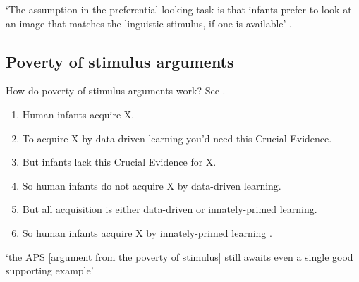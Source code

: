 \documentclass[12pt]{extarticle}
\begin{document}
\begin{multicols}{3}
\begin{enumerate}
\end{enumerate}

‘The assumption in the preferential looking task is that infants prefer to look at an image that matches the linguistic stimulus, if one is available’ \citep{lidz:2003_what}.

\subsection{Poverty of stimulus arguments}

How do poverty of stimulus arguments work? See \citet{pullum:2002_empirical}.

\begin{enumerate}

\item

Human infants acquire X.

\item

To acquire X by data-driven learning you'd need this  Crucial Evidence.

\item

But infants lack this Crucial Evidence for X.

\item

So human infants do not acquire X by data-driven learning.

\item

But all acquisition is either data-driven or innately-primed learning.

\item

So human infants acquire X by innately-primed learning .

\end{enumerate}

‘the APS [argument from the poverty of stimulus] still awaits even a single good supporting example’
\citep[p.\ 47]{pullum:2002_empirical}


    





\footnotesize


\end{multicols}
\end{document}
